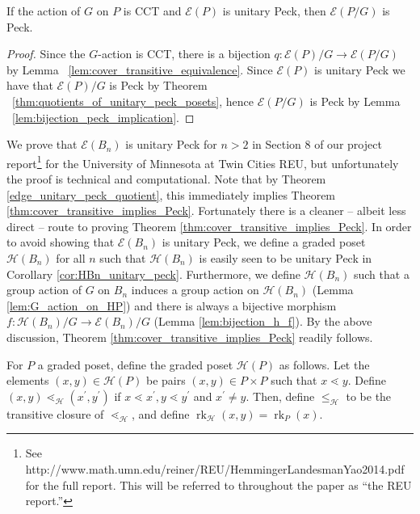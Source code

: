 \documentclass[smallextended, envcountsame, numbook]{svjour3}
\numberwithin{equation}{section}
\newcommand\rk{\operatorname{rk}}
\begin{document}
\begin{theorem}
\label{edge_unitary_peck_quotient}
If the action of $G$ on $P$ is CCT and $\mathcal E(P)$ is unitary Peck, then $\mathcal E(P/G)$ is Peck.
\end{theorem}
\begin{proof}
Since the $G$-action is CCT, there is a bijection $q\colon\mathcal{E}(P)/G \rightarrow \mathcal{E}(P/G)$ by Lemma ~\ref{lem:cover_transitive_equivalence}.  Since $\mathcal{E}(P)$ is unitary Peck we have that $\mathcal{E}(P)/G$ is Peck by Theorem ~\ref{thm:quotients_of_unitary_peck_posets}, hence $\mathcal{E}(P/G)$ is Peck by Lemma ~\ref{lem:bijection_peck_implication}.
\end{proof}

We prove that $\mathcal E(B_n)$ is unitary Peck for $n > 2$ in Section 8 of our project report\footnote{See http://www.math.umn.edu/reiner/REU/HemmingerLandesmanYao2014.pdf for the full report. This will be referred to throughout the paper as ``the REU report.''} for the University of Minnesota at Twin Cities REU, but unfortunately the proof is technical and computational. Note that by Theorem \ref{edge_unitary_peck_quotient}, this immediately implies Theorem \ref{thm:cover_transitive_implies_Peck}. Fortunately there is a cleaner -- albeit less direct -- route to proving Theorem \ref{thm:cover_transitive_implies_Peck}. In order to avoid showing that $\mathcal E(B_n)$ is unitary Peck, we define a graded poset $\mathcal{H}(B_n)$ for all $n$ such that $\mathcal{H}(B_n)$ is easily seen to be unitary Peck in Corollary \ref{cor:HBn_unitary_peck}. Furthermore, we define $\mathcal{H}(B_n)$ such that a group action of $G$ on $B_n$ induces a group action on $\mathcal{H}(B_n)$ (Lemma \ref{lem:G_action_on_HP}) and there is always a bijective morphism $f\colon \mathcal{H}(B_n)/G\rightarrow \mathcal E(B_n)/G$ (Lemma \ref{lem:bijection_h_f}).  By the above discussion, Theorem \ref{thm:cover_transitive_implies_Peck} readily follows.

\begin{definition}
\label{defn:h_map}
For $P$ a graded poset, define the graded poset $\mathcal H(P)$ as follows.  Let the elements $(x, y) \in \mathcal H(P)$ be pairs $(x,y) \in P\times P$ such that $x \lessdot y$.  Define $(x, y) \lessdot_{\mathcal H} (x^\prime, y^\prime)$ if $x \lessdot x^\prime,y\lessdot y^\prime$ and $x^\prime \neq y$.  Then, define $\leq_{\mathcal H}$ to be the transitive closure of $\lessdot_{\mathcal H}$, and define $\rk_{\mathcal H}(x, y) = \rk_P(x)$.
\end{definition}
\end{document}
